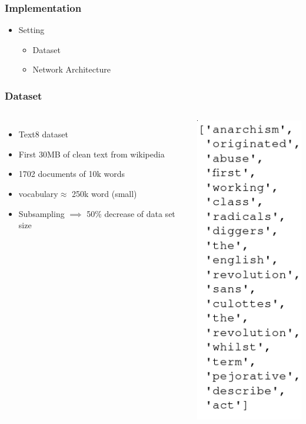 \begin{frame}\frametitle{Implementation}
\begin{itemize}
\item Setting
\begin{itemize}
\item Dataset 
\item Network Architecture 
\end{itemize}
\end{itemize}
\end{frame}

\begin{frame}
\frametitle{Dataset} 
\begin{columns}
    \begin{itemize}
\item Text8 dataset
\item First 30MB of clean text from wikipedia 
\item 1702 documents of 10k words  
\item vocabulary$\approx$ 250k word (small) 
\item Subsampling $\implies$ 50\% decrease of data set size
\end{itemize}
        \includegraphics[scale=0.35]{images/text8snippet}
  \end{columns}
\end{frame}

